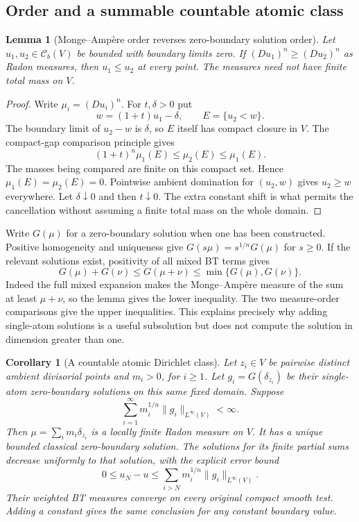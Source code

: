 \documentclass[11pt,a4paper]{article}
\numberwithin{equation}{section}
\newtheorem{lemma}[theorem]{Lemma}
\newtheorem{corollary}[theorem]{Corollary}
\theoremstyle{definition}
\theoremstyle{remark}
\newcommand{\Cb}{\mathcal C_b}
\begin{document}
\subsection{Order and a summable countable atomic class}

\begin{lemma}[Monge--Amp\`ere order reverses zero-boundary solution order]
\label{lem:r3-measure-order}
Let $u_1,u_2\in\Cb(V)$ be bounded with boundary limits zero.
If $(Du_1)^n\geq(Du_2)^n$ as Radon measures, then
$u_1\leq u_2$ at every point. The measures need not have
finite total mass on $V$.
\end{lemma}

\begin{proof}
Write $\mu_i=(Du_i)^n$. For $t,\delta>0$ put
\[
 w=(1+t)u_1-\delta,\qquad E=\{u_2<w\}.
\]
The boundary limit of $u_2-w$ is $\delta$, so $E$ itself
has compact closure in $V$. The compact-gap comparison
principle gives
\[
 (1+t)^n\mu_1(E)\leq\mu_2(E)\leq\mu_1(E).
\]
The masses being compared are finite on this compact set.
Hence $\mu_1(E)=\mu_2(E)=0$. Pointwise ambient domination
for $(u_2,w)$ gives $u_2\geq w$ everywhere. Let
$\delta\downarrow0$ and then $t\downarrow0$. The extra
constant shift is what permits the cancellation without
assuming a finite total mass on the whole domain.
\end{proof}

Write $G(\mu)$ for a zero-boundary solution when one has
been constructed. Positive homogeneity and uniqueness give
$G(s\mu)=s^{1/n}G(\mu)$ for $s\geq0$. If the relevant
solutions exist, positivity of all mixed BT terms gives
\[
 G(\mu)+G(\nu)
       \leq G(\mu+\nu)
       \leq\min\{G(\mu),G(\nu)\}.
 \tag{6}\label{eq:r3-sum-sandwich}
\]
Indeed the full mixed expansion makes the Monge--Amp\`ere
measure of the sum at least $\mu+\nu$, so the lemma gives
the lower inequality. The two measure-order comparisons
give the upper inequalities. This explains precisely why
adding single-atom solutions is a useful subsolution but
does not compute the solution in dimension greater than one.

\begin{corollary}[A countable atomic Dirichlet class]
\label{cor:r3-summable-atomic-dirichlet}
Let $z_i\in V$ be pairwise distinct ambient divisorial points
and $m_i>0$, for $i\geq1$. Let
$g_i=G(\delta_{z_i})$ be their single-atom zero-boundary
solutions on this same fixed domain. Suppose
\[
 \sum_{i=1}^{\infty}m_i^{1/n}\|g_i\|_{L^\infty(V)}<\infty.
 \tag{7}\label{eq:r3-atomic-summability}
\]
Then $\mu=\sum_i m_i\delta_{z_i}$ is a locally finite
Radon measure on $V$. It has a unique bounded classical
zero-boundary solution. The solutions for its finite
partial sums decrease uniformly to that solution, with the
explicit error bound
\[
 0\leq u_N-u\leq
 \sum_{i>N}m_i^{1/n}\|g_i\|_{L^\infty(V)}.
 \tag{8}\label{eq:r3-atomic-tail-bound}
\]
Their weighted BT measures converge on every original compact
smooth test.
Adding a constant gives the same conclusion for any constant
boundary value.
\end{corollary}
\end{document}
